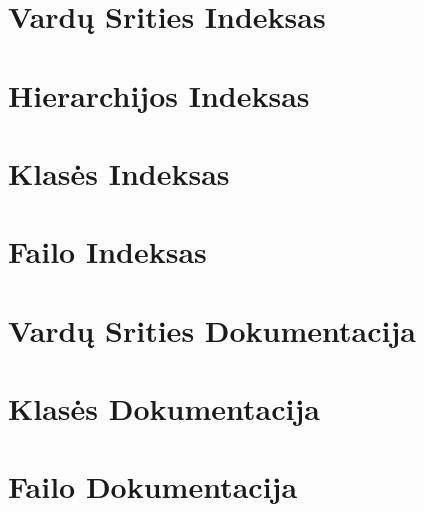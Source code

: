 \usepackage[utf8]{inputenc}

\chapter{Vardų Srities Indeksas}

\chapter{Hierarchijos Indeksas}

\chapter{Klasės Indeksas}

\chapter{Failo Indeksas}

\chapter{Vardų Srities Dokumentacija}

\chapter{Klasės Dokumentacija}



\chapter{Failo Dokumentacija}






  \backmatter
  \newpage
  \clearemptydoublepage
  \printindex

